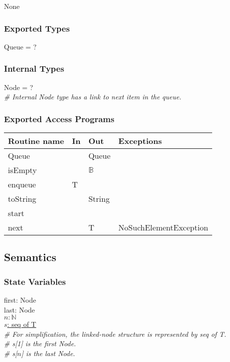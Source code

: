 \documentclass[12pt]{article}
\begin{document}
None

\subsubsection* {Exported Types}

Queue = ?

\subsubsection* {Internal Types}

Node = ?\\

\noindent \textit{\# Internal Node type has a link to next item in the queue.}

\subsubsection* {Exported Access Programs}

\begin{tabular}{| l | l | l | p{5cm} |}
\hline
\textbf{Routine name} & \textbf{In} & \textbf{Out} & \textbf{Exceptions}\\
\hline
Queue & ~ & Queue & ~\\
\hline
isEmpty & ~ & $\mathbb{B}$ & ~\\
\hline
enqueue & T & ~ & ~\\
\hline
toString & ~ & String & ~\\
\hline
start & ~ & ~ & ~\\
\hline
next & ~ & T & NoSuchElementException\\
\hline
\end{tabular}

\newpage

\subsection* {Semantics}

\subsubsection* {State Variables}

first: Node\\
last: Node\\
$n: \mathbb{N}$\\
\underline{$s$: seq of T}\\

\noindent \textit{\# For simplification, the linked-node structure is represented by seq of T.}\\
\noindent \textit{\# s[1] is the first Node.}\\
\noindent \textit{\# s[$n$] is the last Node.}
\end{document}
